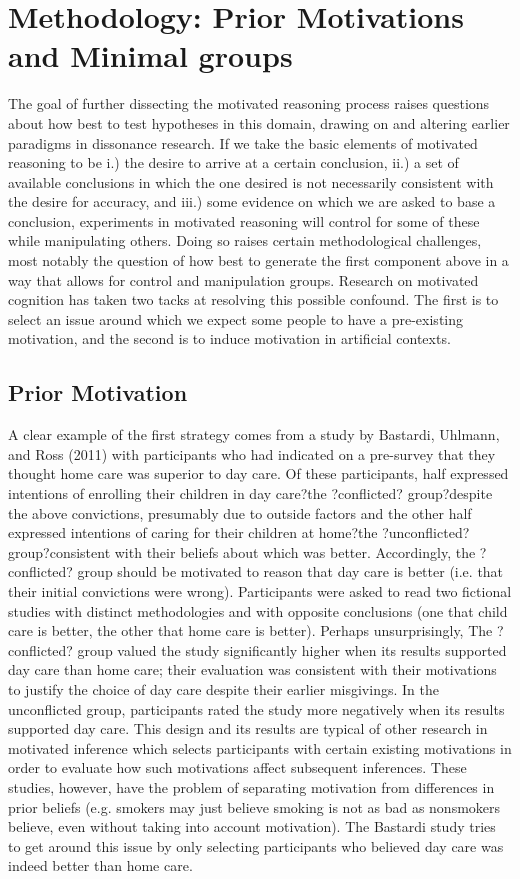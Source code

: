 \documentclass{article}
\begin{document}
\section{Methodology: Prior Motivations and Minimal groups}
The goal of further dissecting the motivated reasoning process raises questions about how best to test hypotheses in this domain, drawing on and altering earlier paradigms in dissonance research. If we take the basic elements of motivated reasoning to be i.) the desire to arrive at a certain conclusion, ii.) a set of available conclusions in which the one desired is not necessarily consistent with the desire for accuracy, and iii.) some evidence on which we are asked to base a conclusion, experiments in motivated reasoning will control for some of these while manipulating others. Doing so raises certain methodological challenges, most notably the question of how best to generate the first component above in a way that allows for control and manipulation groups. Research on motivated cognition has taken two tacks at resolving this possible confound. The first is to select an issue around which we expect some people to have a pre-existing motivation, and the second is to induce motivation in artificial contexts. 
\subsection{Prior Motivation}
A clear example of the first strategy comes from a study by Bastardi, Uhlmann, and Ross (2011) with participants who had indicated on a pre-survey that they thought home care was superior to day care. Of these participants, half expressed intentions of enrolling their children in day care?the ?conflicted? group?despite the above convictions, presumably due to outside factors and the other half expressed intentions of caring for their children at home?the ?unconflicted? group?consistent with their beliefs about which was better. Accordingly, the ?conflicted? group should be motivated to reason that day care is better (i.e. that their initial convictions were wrong). Participants were asked to read two fictional studies with distinct methodologies and with opposite conclusions (one that child care is better, the other that home care is better). Perhaps unsurprisingly, The ?conflicted? group valued the study significantly higher when its results supported day care than home care; their evaluation was consistent with their motivations to justify the choice of day care despite their earlier misgivings. In the unconflicted group, participants rated the study more negatively when its results supported day care. This design and its results are typical of other research in motivated inference which selects participants with certain existing motivations in order to evaluate how such motivations affect subsequent inferences. These studies, however, have the problem of separating motivation from differences in prior beliefs (e.g. smokers may just believe smoking is not as bad as nonsmokers believe, even without taking into account motivation). The Bastardi study tries to get around this issue by only selecting participants who believed day care was indeed better than home care.
\end{document}
